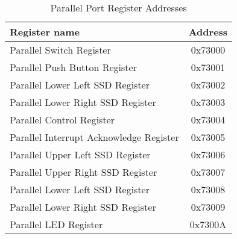 \begin{table}[h]
    \begin{center}
    \begin{tabular}{|l|c|}
    \hline
    \textbf{Register name} & \textbf{Address} \\
    \hline
    Parallel Switch Register & 0x73000 \\
    \hline
    Parallel Push Button Register & 0x73001 \\
    \hline
    Parallel Lower Left SSD Register & 0x73002 \\
    \hline
    Parallel Lower Right SSD Register & 0x73003 \\
    \hline
    Parallel Control Register & 0x73004 \\
    \hline
    Parallel Interrupt Acknowledge Register & 0x73005 \\
    \hline
    Parallel Upper Left SSD Register & 0x73006 \\
    \hline
    Parallel Upper Right SSD Register & 0x73007 \\
    \hline
    Parallel Lower Left SSD Register & 0x73008 \\
    \hline
    Parallel Lower Right SSD Register & 0x73009 \\
    \hline
    Parallel LED Register & 0x7300A \\
    \hline
    \end{tabular}
    \caption{Parallel Port Register Addresses}
    \label{table:parallel_offsets_absolute}
    \end{center}
    \end{table}